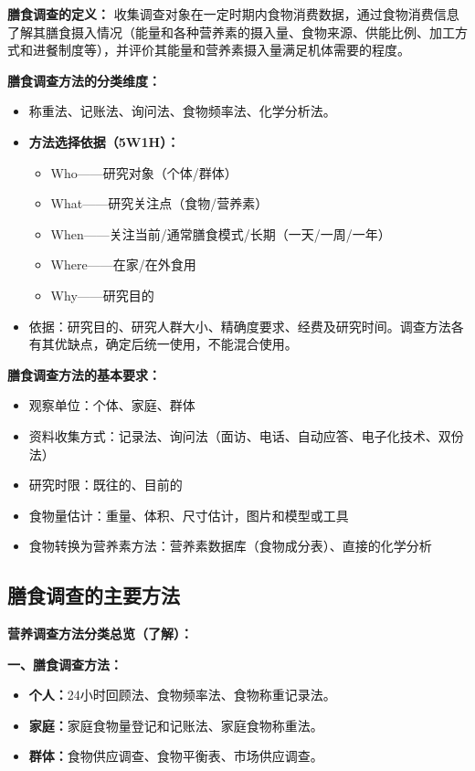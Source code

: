 \begin{defbox}
\textbf{膳食调查的定义：}
收集调查对象在一定时期内食物消费数据，通过食物消费信息了解其膳食摄入情况（能量和各种营养素的摄入量、食物来源、供能比例、加工方式和进餐制度等），并评价其能量和营养素摄入量满足机体需要的程度。

\textbf{膳食调查方法的分类维度：}
\begin{itemize}[leftmargin=*]
    \item 称重法、记账法、询问法、食物频率法、化学分析法。
    \item \textbf{方法选择依据（5W1H）：}
    \begin{itemize}
        \item Who——研究对象（个体/群体）
        \item What——研究关注点（食物/营养素）
        \item When——关注当前/通常膳食模式/长期（一天/一周/一年）
        \item Where——在家/在外食用
        \item Why——研究目的
    \end{itemize}
    \item 依据：研究目的、研究人群大小、精确度要求、经费及研究时间。调查方法各有其优缺点，确定后统一使用，不能混合使用。
\end{itemize}
\end{defbox}

\begin{defbox}
\textbf{膳食调查方法的基本要求：}
\begin{itemize}[leftmargin=*]
    \item 观察单位：个体、家庭、群体
    \item 资料收集方式：记录法、询问法（面访、电话、自动应答、电子化技术、双份法）
    \item 研究时限：既往的、目前的
    \item 食物量估计：重量、体积、尺寸估计，图片和模型或工具
    \item 食物转换为营养素方法：营养素数据库（食物成分表）、直接的化学分析
\end{itemize}
\end{defbox}

\subsection{膳食调查的主要方法}

\begin{tipbox}
\textbf{营养调查方法分类总览（了解）：}

\textbf{一、膳食调查方法：}
\begin{itemize}[leftmargin=*]
    \item \textbf{个人：}24小时回顾法、食物频率法、食物称重记录法。
    \item \textbf{家庭：}家庭食物量登记和记账法、家庭食物称重法。
    \item \textbf{群体：}食物供应调查、食物平衡表、市场供应调查。
\end{itemize}
\end{tipbox}

